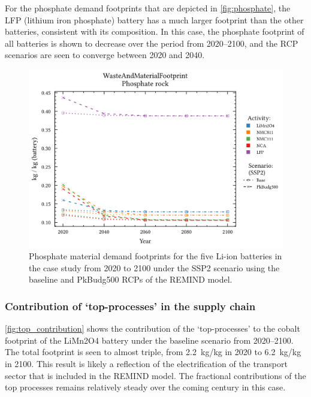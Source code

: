 For the phosphate demand footprints that are depicted in \autoref{fig:phosphate}, the LFP (lithium iron phosphate) battery has a much larger footprint than the other batteries, consistent with its composition. In this case, the phosphate footprint of all batteries is shown to decrease over the period from 2020--2100, and the RCP scenarios are seen to converge between 2020 and 2040.

\begin{figure}[H]
    \centering
    \includegraphics[width=0.7\linewidth]{figures/phosphate.png}
    \caption{Phosphate material demand footprints for the five Li-ion batteries in the case study from 2020 to 2100 under the SSP2 scenario using the baseline and PkBudg500 RCPs of the REMIND model.}\label{fig:phosphate}
\end{figure}

\subsubsection{Contribution of `top-processes' in the supply chain}\label{sec:results-case_study-topprocesses}

\autoref{fig:top_contribution} shows the contribution of the `top-processes' to the cobalt footprint of the LiMn2O4 battery under the baseline scenario from 2020--2100. The total footprint is seen to almost triple, from 2.2~kg/kg in 2020 to 6.2~kg/kg in 2100. This result is likely a reflection of the electrification of the transport sector that is included in the REMIND model. The fractional contributions of the top processes remains relatively steady over the coming century in this case. 

